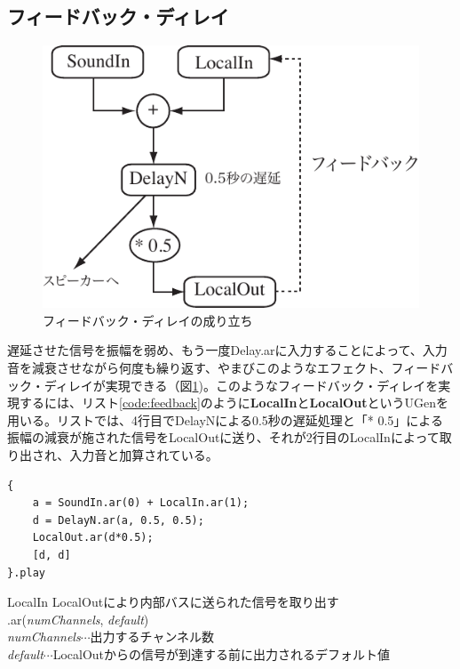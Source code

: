 \documentclass{jsarticle}
\begin{document}
\subsection{フィードバック・ディレイ}
\begin{figure}[htbp]
	\begin{center}
		\includegraphics[scale=0.7]{feedback.pdf}
	\end{center}
	\caption{フィードバック・ディレイの成り立ち}
	\label{fig:feedback}
\end{figure}

遅延させた信号を振幅を弱め、もう一度Delay.arに入力することによって、入力音を減衰させながら何度も繰り返す、やまびこのようなエフェクト、フィードバック・ディレイが実現できる（図\ref{fig:feedback})。このようなフィードバック・ディレイを実現するには、リスト\ref{code:feedback}のように{\bf LocalIn}と{\bf LocalOut}というUGenを用いる。リストでは、4行目でDelayNによる0.5秒の遅延処理と「* 0.5」による振幅の減衰が施された信号をLocalOutに送り、それが2行目のLocalInによって取り出され、入力音と加算されている。

\begin{lstlisting}[caption=フィードバック・ディレイ, label=code:feedback]
{
	a = SoundIn.ar(0) + LocalIn.ar(1);
	d = DelayN.ar(a, 0.5, 0.5);
	LocalOut.ar(d*0.5);
	[d, d]
}.play
\end{lstlisting}

\begin{itembox}[l]{LocalIn}
	{\footnotesize 
	LocalOutにより内部バスに送られた信号を取り出す\\
	.ar({\it numChannels}, {\it default})\\
	{\it numChannels}$\cdots$出力するチャンネル数\\
	{\it default}$\cdots$LocalOutからの信号が到達する前に出力されるデフォルト値\\
	}
\end{itembox}
\end{document}
